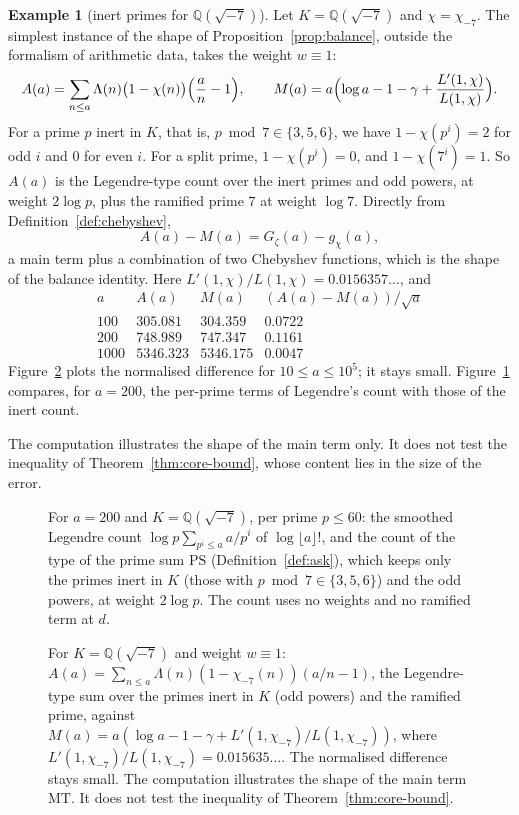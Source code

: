 \documentclass[11pt]{amsbook}
\theoremstyle{plain}
\theoremstyle{definition}
\newtheorem{example}[theorem]{Example}
\theoremstyle{remark}
\numberwithin{equation}{section}
\numberwithin{figure}{chapter}
\numberwithin{table}{chapter}
\newcommand{\Q}{\mathbb{Q}}
\newcommand{\Gz}{G_{\zeta}}
\newcommand{\PS}{\mathrm{PS}}
\newcommand{\MT}{\mathrm{MT}}
\begin{document}
\begin{example}[inert primes for $\Q(\sqrt{-7})$]\label{ex:legendre}
Let $K=\Q(\sqrt{-7})$ and $\chi=\chi_{-7}$. The simplest instance of
the shape of Proposition~\ref{prop:balance}, outside the formalism of
arithmetic data, takes the weight $w\equiv1$:
\[
A(a)=\sum_{n\le a}\Lambda(n)\bigl(1-\chi(n)\bigr)\Bigl(\frac an-1
\Bigr),\qquad
M(a)=a\Bigl(\log a-1-\gamma+\frac{L'(1,\chi)}{L(1,\chi)}\Bigr).
\]
For a prime $p$ inert in $K$, that is, $p\bmod 7\in\{3,5,6\}$, we have
$1-\chi(p^i)=2$ for odd $i$ and $0$ for even $i$. For a split prime,
$1-\chi(p^i)=0$, and $1-\chi(7^i)=1$. So $A(a)$ is the Legendre-type
count over the inert primes and odd powers, at weight $2\log p$, plus
the ramified prime $7$ at weight $\log7$. Directly from
Definition~\ref{def:chebyshev},
\[
A(a)-M(a)=\Gz(a)-g_\chi(a),
\]
a main term plus a combination of two Chebyshev functions, which is
the shape of the balance identity. Here
$L'(1,\chi)/L(1,\chi)=0.0156357\ldots$, and
\[
\begin{array}{rrrr}
a&A(a)&M(a)&(A(a)-M(a))/\sqrt a\\\hline
100&305.081&304.359&0.0722\\
200&748.989&747.347&0.1161\\
1000&5346.323&5346.175&0.0047
\end{array}
\]
Figure~\ref{fig:inert} plots the normalised difference for $10\le
a\le10^5$; it stays small. Figure~\ref{fig:legendre} compares, for
$a=200$, the per-prime terms of Legendre's count with those of the
inert count.
\end{example}

\noindent The computation illustrates the shape of the main term only.
It does not test the inequality of Theorem~\ref{thm:core-bound}, whose
content lies in the size of the error.

\begin{figure}[htbp]
\centering

\caption{For $a=200$ and $K=\Q(\sqrt{-7})$, per prime $p\le60$: the
smoothed Legendre count $\log p\sum_{p^i\le a}a/p^i$ of
$\log\lfloor a\rfloor!$, and the count of the type of the prime sum
$\PS$ (Definition~\ref{def:ask}), which keeps only the primes inert in
$K$ (those with $p\bmod7\in\{3,5,6\}$) and the odd powers, at weight
$2\log p$. The count uses no weights and no ramified term at $d$.}
\label{fig:legendre}
\end{figure}

\begin{figure}[htbp]
\centering

\caption{For $K=\Q(\sqrt{-7})$ and weight $w\equiv1$:
$A(a)=\sum_{n\le a}\Lambda(n)(1-\chi_{-7}(n))(a/n-1)$, the
Legendre-type sum over the primes inert in $K$ (odd powers) and the
ramified prime, against
$M(a)=a(\log a-1-\gamma+L'(1,\chi_{-7})/L(1,\chi_{-7}))$, where
$L'(1,\chi_{-7})/L(1,\chi_{-7})=0.015635\ldots$. The normalised
difference stays small. The computation illustrates the shape of the
main term $\MT$. It does not test the inequality of
Theorem~\ref{thm:core-bound}.}
\label{fig:inert}
\end{figure}
\end{document}
